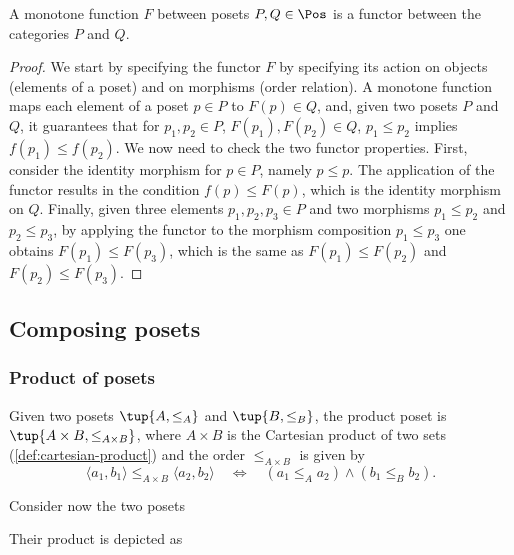 \begin{lemma}
A monotone function $F$ between posets $P,Q \in \Pos$ is a functor between the categories $P$ and $Q$.
\end{lemma}
\begin{proof}
We start by specifying the functor $F$ by specifying its action on objects (elements of a poset) and on morphisms (order relation). A monotone function maps each element of a poset $p\in P$ to $F(p) \in Q$, and, given two posets $P$ and $Q$, it guarantees that for $p_1,p_2\in P$, $F(p_1),F(p_2)\in Q$,  $p_1\leq p_2$ implies $f(p_1)\leq f(p_2)$. We now need to check the two functor properties. First, consider the identity morphism for $p\in P$, namely $p\leq p$. The application of the functor results in the condition $f(p)\leq F(p)$, which is the identity morphism on $Q$. Finally, given three elements $p_1,p_2,p_3\in P$ and two morphisms $p_1\leq p_2$ and $p_2\leq p_3$, by applying the functor to the morphism composition $p_1\leq p_3$ one obtains $F(p_1)\leq F(p_3)$, which is the same as $F(p_1)\leq F(p_2)$ and $F(p_2)\leq F(p_3)$.
\end{proof}



\subsection{Composing posets}

\subsubsection{Product of posets}

\begin{definition}
Given two posets $\tup{A, \leq_A}$
and  $\tup{B, \leq_B}$, the product poset is $\tup{A \times B, \leq_{A\times B}}$, where $A \times B$ is the Cartesian product of two sets (\cref{def:cartesian-product}) and the order $\leq_{A\times B}$ is given by
\begin{equation}
        \langle a_1, b_1 \rangle
        \leq_{A\times B}
        \langle a_2, b_2 \rangle
        \quad
        \Leftrightarrow
        \quad
        ( a_1 \leq_A a_2) \wedge
        (b_1 \leq_B b_2).
    \end{equation}
\end{definition}

\begin{example}
Consider now the two posets
\begin{center}
\end{center}
Their product is depicted as
\begin{center}
\end{center}
\end{example}

